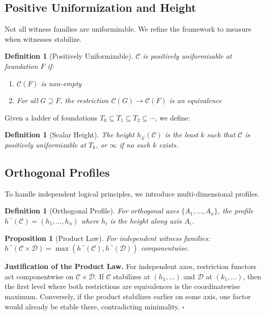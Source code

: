 \documentclass[11pt]{article}
\newtheorem{definition}[theorem]{Definition}
\newtheorem{proposition}[theorem]{Proposition}
\newenvironment{proof}[1][Proof]{\noindent\textbf{#1.}\hspace{0.5em}}{\hfill$\square$\par}
\begin{document}
\subsection{Positive Uniformization and Height}

Not all witness families are uniformizable. We refine the framework to measure when witnesses stabilize.

\begin{definition}[Positively Uniformizable]
$\mathcal{C}$ is \emph{positively uniformizable} at foundation $F$ if:
\begin{enumerate}
\item $\mathcal{C}(F)$ is non-empty
\item For all $G \supseteq F$, the restriction $\mathcal{C}(G) \to \mathcal{C}(F)$ is an equivalence
\end{enumerate}
\end{definition}

Given a ladder of foundations $T_0 \subseteq T_1 \subseteq T_2 \subseteq \cdots$, we define:

\begin{definition}[Scalar Height]
The \emph{height} $h_{\mathcal{L}}(\mathcal{C})$ is the least $k$ such that $\mathcal{C}$ is positively uniformizable at $T_k$, or $\infty$ if no such $k$ exists.
\end{definition}

\subsection{Orthogonal Profiles}

To handle independent logical principles, we introduce multi-dimensional profiles.

\begin{definition}[Orthogonal Profile]
For orthogonal axes $\{A_1, \ldots, A_n\}$, the \emph{profile} $h^{\vec{}}(\mathcal{C}) = (h_1, \ldots, h_n)$ where $h_i$ is the height along axis $A_i$.
\end{definition}

\begin{proposition}[Product Law]
For independent witness families: $h^{\vec{}}(\mathcal{C} \times \mathcal{D}) = \max(h^{\vec{}}(\mathcal{C}), h^{\vec{}}(\mathcal{D}))$ componentwise.
\end{proposition}

\begin{proof}[Justification of the Product Law]
For independent axes, restriction functors act componentwise on $\mathcal{C}\times\mathcal{D}$.
If $\mathcal{C}$ stabilizes at $(h_1,\dots)$ and $\mathcal{D}$ at $(k_1,\dots)$, then the first level
where both restrictions are equivalences is the coordinatewise maximum. Conversely, if the product
stabilizes earlier on some axis, one factor would already be stable there, contradicting minimality.
\end{proof}
\end{document}
